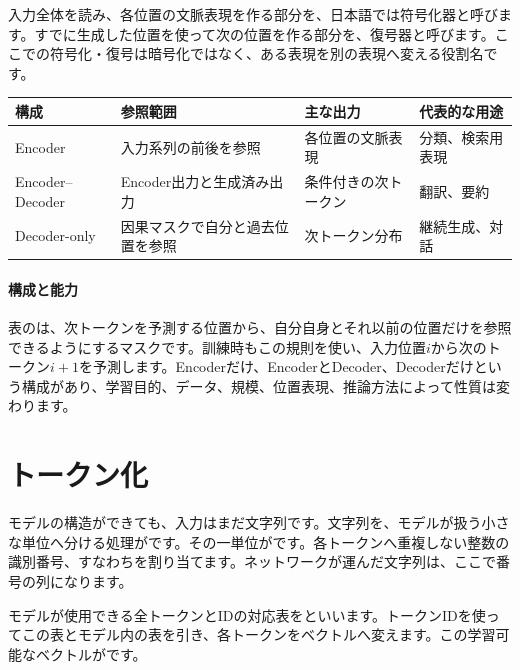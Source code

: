 入力全体を読み、各位置の文脈表現を作る部分を、日本語では符号化器と呼びます。すでに生成した位置を使って次の位置を作る部分を、復号器と呼びます。ここでの符号化・復号は暗号化ではなく、ある表現を別の表現へ変える役割名です。

\begingroup
  \noindent
  \begin{tabularx}{\textwidth}{@{}lYYY@{}}
    \toprule
    構成 & 参照範囲 & 主な出力 & 代表的な用途\\
    \midrule
    Encoder & 入力系列の前後を参照 & 各位置の文脈表現 & 分類、検索用表現\\
    Encoder--Decoder & Encoder出力と生成済み出力 & 条件付きの次トークン & 翻訳、要約\\
    Decoder-only & 因果マスクで自分と過去位置を参照 & 次トークン分布 & 継続生成、対話\\
    \bottomrule
  \end{tabularx}
  \vspace{4mm}
\paragraph{構成と能力}
    表のは、次トークンを予測する位置から、自分自身とそれ以前の位置だけを参照できるようにするマスクです。訓練時もこの規則を使い、入力位置$i$から次のトークン$i+1$を予測します。Encoderだけ、EncoderとDecoder、Decoderだけという構成があり、学習目的、データ、規模、位置表現、推論方法によって性質は変わります。

\par
\endgroup


\section{トークン化}
\label{sec:06-machine-learning-27}

モデルの構造ができても、入力はまだ文字列です。文字列を、モデルが扱う小さな単位へ分ける処理がです。その一単位がです。各トークンへ重複しない整数の識別番号、すなわちを割り当てます。ネットワークが運んだ文字列は、ここで番号の列になります。

モデルが使用できる全トークンとIDの対応表をといいます。トークンIDを使ってこの表とモデル内の表を引き、各トークンをベクトルへ変えます。この学習可能なベクトルがです。

\begingroup
  \centering
  \vspace{5mm}
\begingroup
